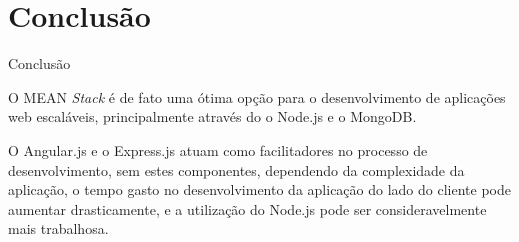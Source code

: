 \documentclass{beamer}
\newlength{\wideitemsep}
\let\olditem\item
\renewcommand{\item}{\setlength{\itemsep}{\wideitemsep}\olditem}
\begin{document}
\section{Conclusão}
\begin{frame}{Conclusão}

 O MEAN \textit{Stack} é de fato uma ótima opção para o desenvolvimento de aplicações web escaláveis, principalmente através do o Node.js e o MongoDB. 
 
 O Angular.js e o Express.js atuam como facilitadores no processo de desenvolvimento, sem estes componentes, dependendo da complexidade da aplicação, o tempo gasto no desenvolvimento da aplicação do lado do cliente pode aumentar drasticamente, e a utilização do Node.js pode ser consideravelmente mais trabalhosa. 
\end{frame}
\end{document}
